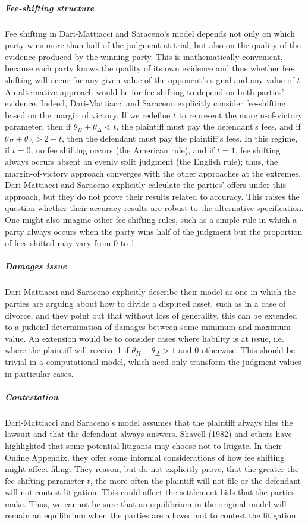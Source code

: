 \documentclass{article}
\begin{document}
\subparagraph{Fee-shifting structure}Fee shifting in Dari-Mattiacci and Saraceno's model depends not only on which party wins more than half of the judgment at trial, but also on the quality of the evidence produced by the winning party. This is mathematically convenient, because each party knows the quality of its own evidence and thus whether fee-shifting will occur for any given value of the opponent's signal and any value of $t$. An alternative approach would be for fee-shifting to depend on both parties' evidence. Indeed, Dari-Mattiacci and Saraceno explicitly consider fee-shifting based on the margin of victory. If we redefine $t$ to represent the margin-of-victory parameter, then if $\theta_\Pi + \theta_\Delta < t$, the plaintiff must pay the defendant's fees, and if $\theta_\Pi + \theta_\Delta > 2 - t$, then the defendant must pay the plaintiff's fees. In this regime, if $t = 0$, no fee shifting occurs (the American rule), and if $t = 1$, fee shifting always occurs absent an evenly split judgment (the English rule); thus, the margin-of-victory approach converges with the other approaches at the extremes. Dari-Mattiacci and Saraceno explicitly calculate the parties' offers under this approach, but they do not prove their results related to accuracy. This raises the question whether their accuracy results are robust to the alternative specification. One might also imagine other fee-shifting rules, such as a simple rule in which a party always occurs when the party wins half of the judgment but the proportion of fees shifted may vary from 0 to 1.

\subparagraph{Damages issue}Dari-Mattiacci and Saraceno explicitly describe their model as one in which the parties are arguing about how to divide a disputed asset, such as in a case of divorce, and they point out that without loss of generality, this can be extended to a judicial determination of damages between some minimum and maximum value. An extension would be to consider cases where liability is at issue, i.e. where the plaintiff will receive 1 if $\theta_\Pi + \theta_\Delta > 1$ and 0 otherwise. This should be trivial in a computational model, which need only transform the judgment values in particular cases.

\subparagraph{Contestation}Dari-Mattiacci and Saraceno's model assumes that the plaintiff always files the lawsuit and that the defendant always answers. Shavell (1982) \cite{shavell} and others have highlighted that some potential litigants may choose not to litigate. In their Online Appendix, they offer some informal considerations of how fee shifting might affect filing. They reason, but do not explicitly prove, that the greater the fee-shifting parameter $t$, the more often the plaintiff will not file or the defendant will not contest litigation. This could affect the settlement bids that the parties make. Thus, we cannot be sure that an equilibrium in the original model will remain an equilibrium when the parties are allowed not to contest the litigation.
\end{document}
